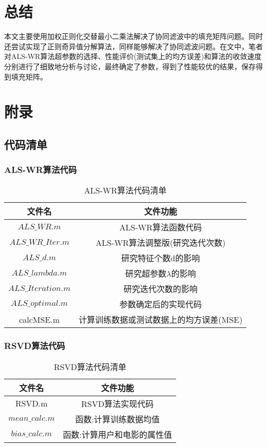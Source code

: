 \documentclass[11pt]{article}
\begin{document}
\section{总结}
本文主要使用加权正则化交替最小二乘法解决了协同滤波中的填充矩阵问题。同时还尝试实现了正则奇异值分解算法，同样能够解决了协同滤波问题。在文中，笔者对ALS-WR算法超参数的选择、性能评价(测试集上的均方误差)和算法的收敛速度分别进行了细致地分析与讨论，最终确定了参数，得到了性能较优的结果，保存得到填充矩阵。

\newpage
\onecolumn
\section{附录}
\subsection{代码清单}
\subsubsection{ALS-WR算法代码}
\begin{table}[!htbp]
  \centering  
  \begin{tabular}{c|c} 
  \hline\hline
  文件名 & 文件功能\\ \hline
  $ALS\_WR.m$ & ALS-WR算法函数代码 \\
  $ALS\_WR\_Iter.m$ & ALS-WR算法调整版(研究迭代次数) \\ \hline
  $ALS\_d.m$ & 研究特征个数d的影响 \\
  $ALS\_lambda.m$ & 研究超参数$\lambda$的影响\\
  $ALS\_Iteration.m$ & 研究迭代次数的影响\\ \hline
  $ALS\_optimal.m$ & 参数确定后的实现代码 \\
  calcMSE.m & 计算训练数据或测试数据上的均方误差(MSE) \\
  \hline\hline
\end{tabular}
\caption{ALS-WR算法代码清单}
\end{table}

\subsubsection{RSVD算法代码}
\begin{table}[!htbp]
  \centering  
  \begin{tabular}{c|c} 
  \hline\hline
  文件名 & 文件功能\\ \hline
  RSVD.m & RSVD算法实现代码 \\ \hline
  $mean\_calc.m$& 函数:计算训练数据均值 \\
  $bias\_calc.m$ & 函数:计算用户和电影的属性值 \\
  \hline\hline
\end{tabular}
\caption{RSVD算法代码清单}
\end{table}
\end{document}
